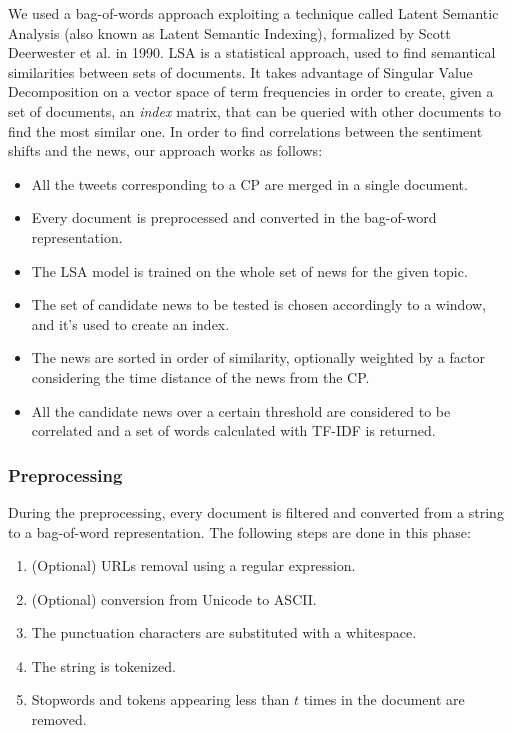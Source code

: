 We used a bag-of-words approach exploiting a technique called Latent Semantic Analysis (also known as Latent Semantic Indexing), formalized by Scott Deerwester et al. in 1990\cite{LSA}. LSA is a statistical approach, used to find semantical similarities between sets of documents. It takes advantage of Singular Value Decomposition on a vector space of term frequencies in order to create, given a set of documents, an \emph{index} matrix, that can be queried with other documents to find the most similar one. In order to find correlations between the sentiment shifts and the news, our approach works as follows:
\begin{itemize}
\item All the tweets corresponding to a CP are merged in a single document.
\item Every document is preprocessed and converted in the bag-of-word representation.
\item The LSA model is trained on the whole set of news for the given topic.
\item The set of candidate news to be tested is chosen accordingly to a window, and it's used to create an index.
\item The news are sorted in order of similarity, optionally weighted by a factor considering the time distance of the news from the CP.
\item All the candidate news over a certain threshold are considered to be correlated and a set of words calculated with TF-IDF is returned.
\end{itemize}

\subsubsection*{Preprocessing}
During the preprocessing, every document is filtered and converted from a string to a bag-of-word representation. The following steps are done in this phase:
\begin{enumerate}
\item (Optional) URLs removal using a regular expression.
\item (Optional) conversion from Unicode to ASCII.
\item The punctuation characters are substituted with a whitespace.
\item The string is tokenized.
\item Stopwords and tokens appearing less than $t$ times in the document are removed.
\end{enumerate}

